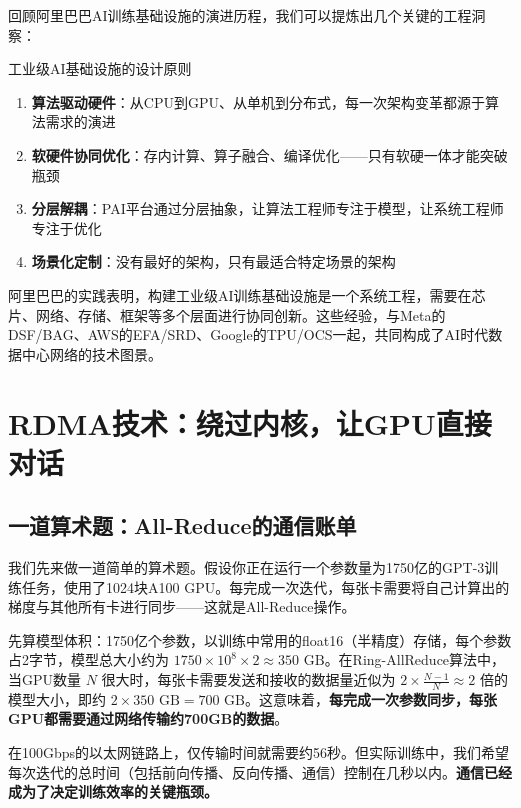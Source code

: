 回顾阿里巴巴AI训练基础设施的演进历程，我们可以提炼出几个关键的工程洞察：

\begin{insightbox}{工业级AI基础设施的设计原则}
\begin{enumerate}
    \item \textbf{算法驱动硬件}：从CPU到GPU、从单机到分布式，每一次架构变革都源于算法需求的演进
    \item \textbf{软硬件协同优化}：存内计算、算子融合、编译优化——只有软硬一体才能突破瓶颈
    \item \textbf{分层解耦}：PAI平台通过分层抽象，让算法工程师专注于模型，让系统工程师专注于优化
    \item \textbf{场景化定制}：没有最好的架构，只有最适合特定场景的架构
\end{enumerate}
\end{insightbox}

阿里巴巴的实践表明，构建工业级AI训练基础设施是一个系统工程，需要在芯片、网络、存储、框架等多个层面进行协同创新。这些经验，与Meta的DSF/BAG、AWS的EFA/SRD、Google的TPU/OCS一起，共同构成了AI时代数据中心网络的技术图景。

\section{RDMA技术：绕过内核，让GPU直接对话}

\subsection{一道算术题：All-Reduce的通信账单}

我们先来做一道简单的算术题。假设你正在运行一个参数量为1750亿的GPT-3训练任务，使用了1024块A100 GPU。每完成一次迭代，每张卡需要将自己计算出的梯度与其他所有卡进行同步——这就是All-Reduce操作。

先算模型体积：1750亿个参数，以训练中常用的float16（半精度）存储，每个参数占2字节，模型总大小约为 $1750 \times 10^8 \times 2 \approx 350\text{ GB}$。在Ring-AllReduce算法中，当GPU数量 $N$ 很大时，每张卡需要发送和接收的数据量近似为 $2 \times \frac{N-1}{N} \approx 2$ 倍的模型大小，即约 $2 \times 350\text{ GB} = 700\text{ GB}$。这意味着，\textbf{每完成一次参数同步，每张GPU都需要通过网络传输约700GB的数据}。

在100Gbps的以太网链路上，仅传输时间就需要约56秒。但实际训练中，我们希望每次迭代的总时间（包括前向传播、反向传播、通信）控制在几秒以内。\textbf{通信已经成为了决定训练效率的关键瓶颈。}

